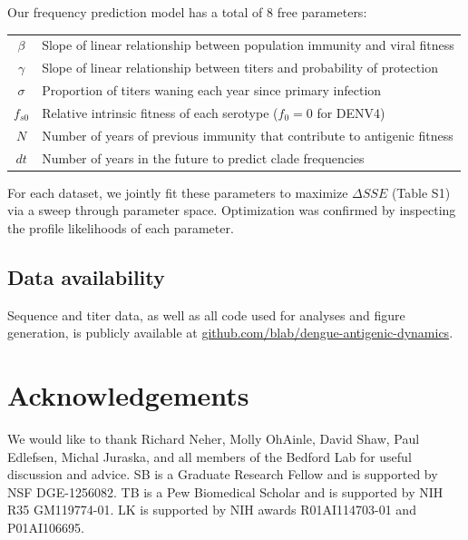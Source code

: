 \documentclass[11pt,oneside,letterpaper]{article}
\begin{document}
Our frequency prediction model has a total of 8 free parameters:
\begin{table}[h!]
  \begin{center}
    \label{parameter_definition}
    \begin{tabular}{c|l}
      $\beta$ & Slope of linear relationship between population immunity and viral fitness\\
      $\gamma$ & Slope of linear relationship between titers and probability of protection\\
      $\sigma$ & Proportion of titers waning each year since primary infection\\
      $f_{s0}$ & Relative intrinsic fitness of each serotype ($f_0 = 0$ for DENV4)\\
      $N$ & Number of years of previous immunity that contribute to antigenic fitness\\
      $dt$ & Number of years in the future to predict clade frequencies\\
    \end{tabular}
  \end{center}
\end{table}

For each dataset, we jointly fit these parameters to maximize $\Delta SSE$ (Table S1) via a sweep through parameter space.
Optimization was confirmed by inspecting the profile likelihoods of each parameter.

\subsection*{Data availability}
Sequence and titer data, as well as all code used for analyses and figure generation, is publicly available at \href{https://github.com/blab/dengue-antigenic-dynamics}{github.com/blab/dengue-antigenic-dynamics}.

\section*{Acknowledgements}
We would like to thank Richard Neher, Molly OhAinle, David Shaw, Paul Edlefsen, Michal Juraska, and all members of the Bedford Lab for useful discussion and advice.
SB is a Graduate Research Fellow and is supported by NSF DGE-1256082.
TB is a Pew Biomedical Scholar and is supported by NIH R35 GM119774-01.
LK is supported by NIH awards R01AI114703-01 and P01AI106695.



\end{document}
